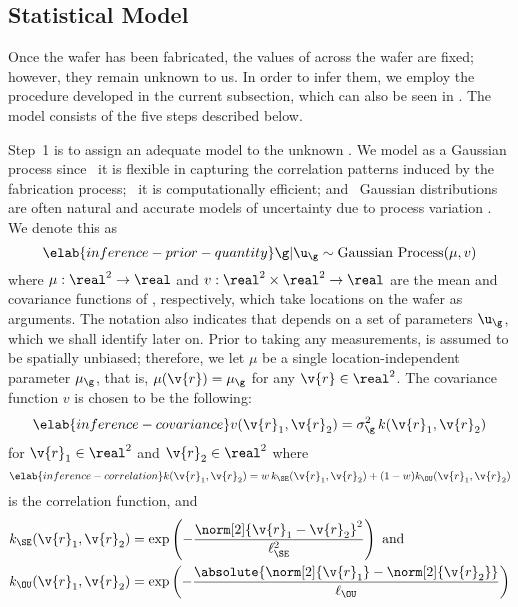 \subsection{Statistical Model}

Once the wafer has been fabricated, the values of \g across the wafer are fixed;
however, they remain unknown to us. In order to infer them, we employ the
procedure developed in the current subsection, which can also be seen in
. The model consists of the five steps
described below.

Step~1 is to assign an adequate model to the unknown \g. We model \g as a
Gaussian process \cite{rasmussen2006} since \one~it is flexible in capturing the
correlation patterns induced by the fabrication process; \two~it is
computationally efficient; and \three~Gaussian distributions are often natural
and accurate models of uncertainty due to process variation \cite{reda2009,
srivastava2010, juan2012}. We denote this as
\begin{equation} \elab{inference-prior-quantity}
  \g | \u_\g \sim \mathrm{Gaussian\ Process}(\mu, v)
\end{equation}
where $\mu: \real^2 \to \real$ and $v: \real^2 \times \real^2 \to \real$ are the
mean and covariance functions of \g, respectively, which take locations on the
wafer as arguments. The notation also indicates that \g depends on a set of
parameters $\u_\g$, which we shall identify later on. Prior to taking any
measurements, \g is assumed to be spatially unbiased; therefore, we let $\mu$ be
a single location-independent parameter $\mu_\g$, that is, $\mu(\v{r}) = \mu_\g$
for any $\v{r} \in \real^2$. The covariance function $v$ is chosen to be the
following:
\begin{equation} \elab{inference-covariance}
  v(\v{r}_1, \v{r}_2) = \sigma_\g^2 \, k(\v{r}_1, \v{r}_2)
\end{equation}
for $\v{r}_1 \in \real^2$ and $\v{r}_2 \in \real^2$ where
\begin{equation} \elab{inference-correlation}
  k(\v{r}_1, \v{r}_2) = w \, k_\SE(\v{r}_1, \v{r}_2) + (1 - w) k_\OU(\v{r}_1, \v{r}_2)
\end{equation}
is the correlation function, and
\begin{align*}
  k_\SE(\v{r}_1, \v{r}_2) & = \exp\left(-\frac{\norm[2]{\v{r}_1 - \v{r}_2}^2}{\ell_\SE^2}\right) \text{ and} \\
  k_\OU(\v{r}_1, \v{r}_2) & = \exp\left(-\frac{\absolute{\norm[2]{\v{r}_1} - \norm[2]{\v{r}_2}}}{\ell_\OU}\right)
\end{align*}
